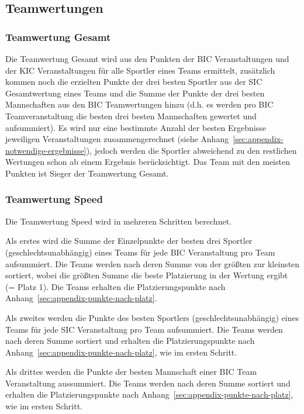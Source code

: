 \subsection{Teamwertungen}
\subsubsection{Teamwertung Gesamt}
\label{subsec:teamwertung-gesamt}
Die Teamwertung Gesamt wird aus den Punkten der BIC Veranstaltungen und der KIC Veranstaltungen für alle Sportler eines Teams ermittelt, zusätzlich kommen noch die erzielten Punkte der drei besten Sportler aus der SIC Gesamtwertung eines Teams und die Summe der Punkte der drei besten Mannschaften aus den BIC Teamwertungen hinzu (d.h. es werden pro BIC Teamveranstaltung die besten drei besten Mannschaften gewertet und aufsummiert). Es wird nur eine bestimmte Anzahl der besten Ergebnisse jeweiligen Veranstaltungen zusammengerechnet (siehe Anhang~\ref{sec:appendix-notwendige-ergebnisse}), jedoch werden die Sportler abweichend zu den restlichen Wertungen schon ab einem Ergebnis berücksichtigt. Das Team mit den meisten Punkten ist Sieger der Teamwertung Gesamt.

\subsubsection{Teamwertung Speed}
\label{subsec:teamwertung-speed}
Die Teamwertung Speed wird in mehreren Schritten berechnet.

Als erstes wird die Summe der Einzelpunkte der besten drei Sportler (geschlechtsunabhängig) eines Teams für jede BIC Veranstaltung pro Team aufsummiert. Die Teams werden nach deren Summe von der größten zur kleinsten sortiert, wobei die größten Summe die beste Platzierung in der Wertung ergibt (= Platz 1). Die Teams erhalten die Platzierungspunkte nach Anhang~\ref{sec:appendix-punkte-nach-platz}.

Als zweites werden die Punkte des besten Sportlers (geschlechtsunabhängig) eines Teams für jede SIC Veranstaltung pro Team aufsummiert. Die Teams werden nach deren Summe sortiert und erhalten die Platzierungspunkte nach Anhang~\ref{sec:appendix-punkte-nach-platz}, wie im ersten Schritt.

Als drittes werden die Punkte der besten Mannschaft einer BIC Team Veranstaltung aussummiert. Die Teams werden nach deren Summe sortiert und erhalten die Platzierungspunkte nach Anhang~\ref{sec:appendix-punkte-nach-platz}, wie im ersten Schritt.

